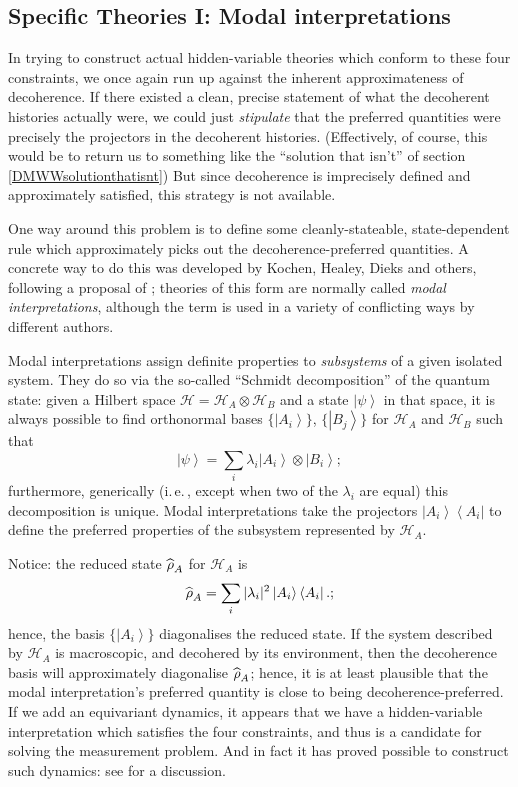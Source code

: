 \documentclass[12pt]{article}
\newcommand{\iec}{\mbox{i.\,e.\,}}
\newcommand{\be}{\begin{equation}}
\newcommand{\ee}{\end{equation}}
\newcommand{\mc}[1]{\ensuremath{\mathcal{#1}}}
\newcommand{\ket}[1]{\ensuremath{\left|  #1 \right\rangle}}
\newcommand{\bra}[1]{\ensuremath{\left\langle #1 \right|}}
\newcommand{\proj}[2]{\ensuremath{\ket{#1} \bra{#2}}}
\newcommand{\tpk}[2]{\ensuremath{\ket{#1}\!\otimes\!\ket{#2}}}
\newcommand{\op}[1]{\ensuremath{\widehat{\textsf{\ensuremath{#1}}}}}
\newcommand{\denop}{\op{\rho}}
\begin{document}
\subsection{Specific Theories I: Modal interpretations}

In trying to construct actual hidden-variable theories which conform to these four constraints, we once again run up against the inherent approximateness of decoherence. If there existed a clean, precise statement of what the decoherent histories actually were, we could just \emph{stipulate} that the preferred quantities were precisely the projectors in the decoherent histories. (Effectively, of course, this would be to return us to something like the ``solution that isn't'' of section \ref{DMWWsolutionthatisnt}) But since decoherence is imprecisely defined and  approximately satisfied, this strategy is not available. 

One way around this problem is to define some cleanly-stateable, state-dependent rule which approximately picks out the decoherence-preferred quantities. A concrete way to do this was  developed by Kochen, Healey, Dieks and others, following a proposal of ; theories of this form are normally called \emph{modal interpretations}, although the term is used in a variety of conflicting ways by different authors. 

Modal interpretations assign definite properties to \emph{subsystems} of a given isolated system. They do so via the so-called ``Schmidt decomposition'' of the quantum state: given a Hilbert space $\mc{H}=\mc{H}_A\otimes \mc{H}_B$ and a state \ket{\psi} in that space, it is always possible to find orthonormal bases $\{\ket{A_i}\}$, $\{\ket{B_j}\}$ for $\mc{H}_A$ and $\mc{H}_B$ such that 
\be 
\ket{\psi}=\sum_i \lambda_i \tpk{A_i}{B_i};
\ee
furthermore, generically (\iec, except when two of the $\lambda_i$ are equal)  this decomposition is unique. Modal interpretations take the projectors $\proj{A_i}{A_i}$ to define the preferred properties of the subsystem represented by $\mc{H}_A$. 

Notice: the reduced state $\denop_A$ for $\mc{H}_A$ is 
\be \denop_A=\sum_i |\lambda_i|^2 \proj{A_i}{A_i}.;\ee
hence, the basis $\{\ket{A_i}\}$ diagonalises the reduced state. If the system described by $\mc{H}_A$ is macroscopic, and decohered by its environment, then the decoherence basis will approximately diagonalise $\denop_A$; hence, it is at least plausible that the modal interpretation's preferred quantity is close to being decoherence-preferred. If we add an equivariant dynamics, it appears that we have a hidden-variable interpretation which satisfies the four constraints, and thus is a candidate for solving the measurement problem. And in fact it has proved possible to construct such dynamics: see  for a discussion.
\end{document}
